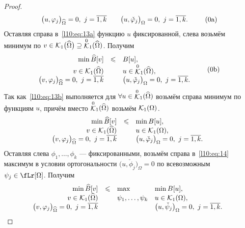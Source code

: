 \begin{proof}
\begin{equation}
\begin{array}{rcl}
			\big(u,\phi_j\big)_{\widehat{\Omega}}=0,\ j=\overline{1,k}&  &\big(u,\check{\phi}_j\big)_{\Omega}=0,\ j=\overline{1,k}.
		\end{array}\tag{\theequation a}\hfill
	\end{equation} 
	Оставляя справа в~\eqref{l10:eq:13a} функцию $u$ фиксированной, слева возьмём минимум по $v\in\mathcal{K}_1\big(\widehat{\Omega}\big)\supseteq{\mathop{\ensuremath{\mathcal{K}}}\limits^0}_1(\widehat{\Omega})$. Получим
	\begin{equation}\label{l10:eq:13b}
		\hfill\begin{array}{rcl}
			\min\widehat{B}[v]&\leqslant&B[u],\\
			v\in\K_1(\widehat{\Omega})& &u\in{\mathop{\K}\limits^0}_1(\widehat{\Omega}),\\
			\big(v,\phi_j\big)_{\widehat{\Omega}}=0,\ j=\overline{1,k}&  &\big(u,\check{\phi}_j\big)_{\Omega}=0,\ j=\overline{1,k}.
		\end{array}\tag{\theequation b}\hfill
	\end{equation} 
	Так как~\eqref{l10:eq:13b} выполняется для $\forall u\in{\mathop{\ensuremath{\mathcal{K}}}\limits^0}_1(\widehat{\Omega})$ возьмём справа минимум по функциям $u$, причём вместо ${\mathop{\mathcal{K}}\limits^0}_1(\widehat{\Omega})$ возьмём $\mathcal{K}_1(\Omega)$.
	\begin{equation}\label{l10:eq:14}
		\hfill\begin{array}{rcl}
			\min\widehat{B}[v]&\leqslant&\min B[u],\\
			v\in\K_1(\widehat{\Omega})& &u\in\K_1(\Omega),\\
			\big(v,\phi_j\big)_{\widehat{\Omega}}=0,\ j=\overline{1,k}&  &\big(u,\check{\phi}_j\big)_{\Omega}=0,\ j=\overline{1,k}.
		\end{array}\hfill
	\end{equation} 
	Оставляя слева $\phi_1,\ldots,\phi_k$ --- фиксированными, возьмём справа в~\eqref{l10:eq:14} максимум в условии ортогональности $\big(u,\check{\phi}_j\big)_{\Omega}=0$ по всевозможным $\psi_j\in\fLr[\Omega]$. Получим
	\begin{equation}\label{l10:eq:15}
		\hfill\begin{array}{rcll}
			\min\widehat{B}[v]&\leqslant&\max&\min B[u],\\
			v\in\K_1(\widehat{\Omega})&  &\psi_1,\ldots,\psi_k &u\in\K_1(\Omega),\\
			\big(v,\phi_j\big)_{\widehat{\Omega}}=0,\ j=\overline{1,k}& &   &\big(u,\check{\psi}_j\big)_{\Omega}=0,\ j=\overline{1,k}.
		\end{array}\hfill
	\end{equation}

\end{proof}
